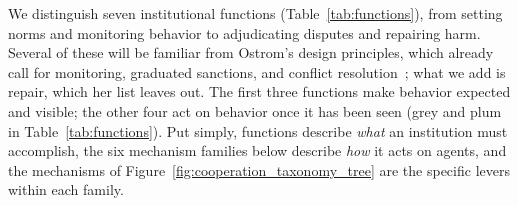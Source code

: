 \documentclass[runningheads]{llncs}
\begin{document}
We distinguish seven institutional functions (Table~\mbox{\ref{tab:functions}}), from setting norms and monitoring behavior to adjudicating disputes and repairing harm. Several of these will be familiar from Ostrom's design principles, which already call for monitoring, graduated sanctions, and conflict resolution~\mbox{\citep{ostromGoverningCommonsEvolution1990}}; what we add is repair, which her list leaves out. The first three functions make behavior expected and visible; the other four act on behavior once it has been seen (grey and plum in Table~\mbox{\ref{tab:functions}}). Put simply, functions describe \emph{what} an institution must accomplish, the six mechanism families below describe \emph{how} it acts on agents, and the mechanisms of Figure~\mbox{\ref{fig:cooperation_taxonomy_tree}} are the specific levers within each family.
\end{document}
